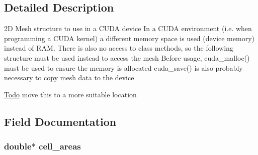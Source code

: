 

\subsection{Detailed Description}
2D Mesh structure to use in a CUDA device In a CUDA environment (i.e. when programming a CUDA kernel) a different memory space is used (device memory) instead of RAM. There is also no access to class methods, so the following structure must be used instead to access the mesh Before usage, cuda\_\-malloc() must be used to ensure the memory is allocated cuda\_\-save() is also probably necessary to copy mesh data to the device

\begin{Desc}
\item[\hyperlink{todo__todo000003}{Todo}]move this to a more suitable location \end{Desc}


\subsection{Field Documentation}
\hypertarget{structFVL_1_1CFVMesh2D__cuda_ae8676892fd56ea5c4828b46ed48c222d}{
\subsubsection[{cell\_\-areas}]{\setlength{\rightskip}{0pt plus 5cm}double$\ast$ {\bf cell\_\-areas}}}
\label{dd/d46/structFVL_1_1CFVMesh2D__cuda_ae8676892fd56ea5c4828b46ed48c222d}


